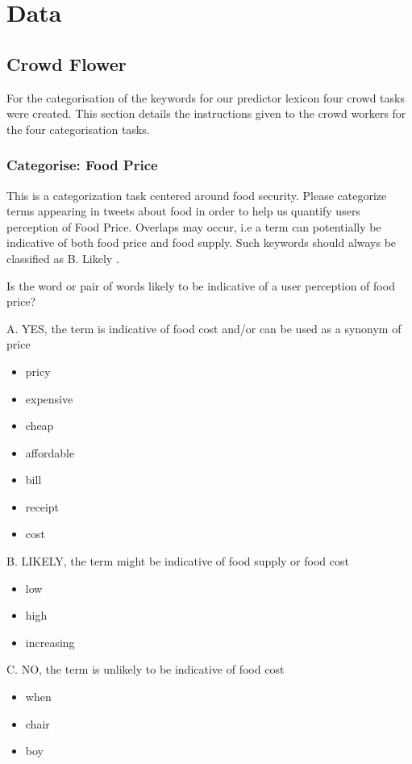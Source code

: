 \chapter{Data}

\section{Crowd Flower}

For the categorisation of the keywords for our predictor lexicon four crowd tasks were created. This section details the instructions given to the crowd workers for the four categorisation tasks. 

\subsection{Categorise: Food Price}

This is a categorization task centered around food security. Please categorize terms appearing in tweets about food in order to help us quantify users perception of Food Price. Overlaps may occur, i.e a term can potentially be indicative of both food price and food supply. Such keywords should always be classified as B. Likely .

Is the word or pair of words likely to be indicative of a user perception of food price?

A. YES, the term is indicative of food cost and/or can be used as a synonym of price

\begin{itemize}

  \item pricy 
  \item expensive 
  \item cheap 
  \item affordable 
  \item bill 
  \item receipt 
  \item cost 
\end{itemize}


B. LIKELY, the term might be indicative of food supply or food cost
\begin{itemize}
  \item low
  \item high 
  \item increasing 
\end{itemize}


C. NO, the term is unlikely to be indicative of food cost 
\begin{itemize}
  \item when
  \item chair
  \item boy
\end{itemize}


